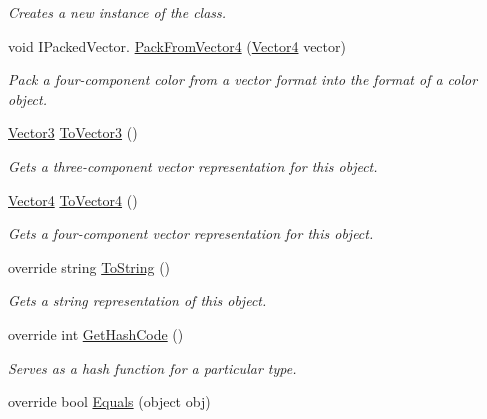 \begin{DoxyCompactItemize}
\begin{DoxyCompactList}\small\item\em Creates a new instance of the class.\end{DoxyCompactList}\item 
void I\+Packed\+Vector. \hyperlink{struct_microsoft_1_1_xna_1_1_framework_1_1_color_af90c30d10bf796f3c70561583c6f5d28}{Pack\+From\+Vector4} (\hyperlink{struct_microsoft_1_1_xna_1_1_framework_1_1_vector4}{Vector4} vector)
\begin{DoxyCompactList}\small\item\em Pack a four-\/component color from a vector format into the format of a color object.\end{DoxyCompactList}\item 
\hyperlink{struct_microsoft_1_1_xna_1_1_framework_1_1_vector3}{Vector3} \hyperlink{struct_microsoft_1_1_xna_1_1_framework_1_1_color_aad0425c4f85063d996c80d350a75d364}{To\+Vector3} ()
\begin{DoxyCompactList}\small\item\em Gets a three-\/component vector representation for this object.\end{DoxyCompactList}\item 
\hyperlink{struct_microsoft_1_1_xna_1_1_framework_1_1_vector4}{Vector4} \hyperlink{struct_microsoft_1_1_xna_1_1_framework_1_1_color_a38feaeacc0631592dd35df2d34542c14}{To\+Vector4} ()
\begin{DoxyCompactList}\small\item\em Gets a four-\/component vector representation for this object.\end{DoxyCompactList}\item 
override string \hyperlink{struct_microsoft_1_1_xna_1_1_framework_1_1_color_a1b4b83bebc86828a05216807f5c8b813}{To\+String} ()
\begin{DoxyCompactList}\small\item\em Gets a string representation of this object.\end{DoxyCompactList}\item 
override int \hyperlink{struct_microsoft_1_1_xna_1_1_framework_1_1_color_aebde84f65ffc256b21a3b34d968e0eba}{Get\+Hash\+Code} ()
\begin{DoxyCompactList}\small\item\em Serves as a hash function for a particular type.\end{DoxyCompactList}\item 
override bool \hyperlink{struct_microsoft_1_1_xna_1_1_framework_1_1_color_a7db378a29b175ab423d5266678b824f2}{Equals} (object obj)

\end{DoxyCompactItemize}
